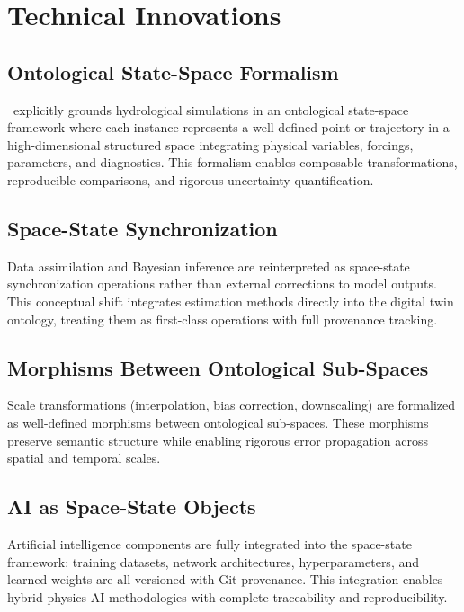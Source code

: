 \section{Technical Innovations}

\subsection{Ontological State-Space Formalism}

\hydrot\ explicitly grounds hydrological simulations in an ontological state-space framework where each instance represents a well-defined point or trajectory in a high-dimensional structured space integrating physical variables, forcings, parameters, and diagnostics. This formalism enables composable transformations, reproducible comparisons, and rigorous uncertainty quantification.

\subsection{Space-State Synchronization}

Data assimilation and Bayesian inference are reinterpreted as space-state synchronization operations rather than external corrections to model outputs. This conceptual shift integrates estimation methods directly into the digital twin ontology, treating them as first-class operations with full provenance tracking.

\subsection{Morphisms Between Ontological Sub-Spaces}

Scale transformations (interpolation, bias correction, downscaling) are formalized as well-defined morphisms between ontological sub-spaces. These morphisms preserve semantic structure while enabling rigorous error propagation across spatial and temporal scales.

\subsection{AI as Space-State Objects}

Artificial intelligence components are fully integrated into the space-state framework: training datasets, network architectures, hyperparameters, and learned weights are all versioned with Git provenance. This integration enables hybrid physics-AI methodologies with complete traceability and reproducibility.

